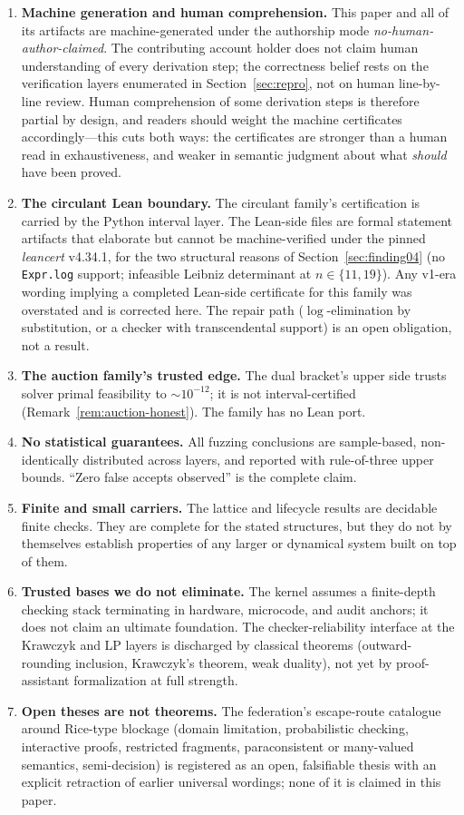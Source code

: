 \documentclass[11pt]{article}
\theoremstyle{definition}
\theoremstyle{remark}
\newcommand{\lean}[1]{\texttt{#1}}
\begin{document}
\begin{enumerate}
\item \textbf{Machine generation and human comprehension.}
This paper and all of its artifacts are machine-generated under the
authorship mode \emph{no-human-author-claimed}. The contributing account
holder does not claim human understanding of every derivation step; the
correctness belief rests on the verification layers enumerated in
Section~\ref{sec:repro}, not on human line-by-line review. Human
comprehension of some derivation steps is therefore partial by design, and
readers should weight the machine certificates accordingly---this cuts both
ways: the certificates are stronger than a human read in exhaustiveness, and
weaker in semantic judgment about what \emph{should} have been proved.
\item \textbf{The circulant Lean boundary.} The circulant family's
certification is carried by the Python interval layer. The Lean-side files
are formal statement artifacts that elaborate but cannot be machine-verified
under the pinned \emph{leancert} v4.34.1, for the two structural reasons of
Section~\ref{sec:finding04} (no \lean{Expr.log} support; infeasible Leibniz
determinant at $n\in\{11,19\}$). Any v1-era wording implying a completed
Lean-side certificate for this family was overstated and is corrected here.
The repair path ($\log$-elimination by substitution, or a checker with
transcendental support) is an open obligation, not a result.
\item \textbf{The auction family's trusted edge.} The dual bracket's upper
side trusts solver primal feasibility to $\sim 10^{-12}$; it is not
interval-certified (Remark~\ref{rem:auction-honest}). The family has no Lean
port.
\item \textbf{No statistical guarantees.} All fuzzing conclusions are
sample-based, non-identically distributed across layers, and reported with
rule-of-three upper bounds. ``Zero false accepts observed'' is the complete
claim.
\item \textbf{Finite and small carriers.} The lattice and lifecycle results
are decidable finite checks. They are complete for the stated structures, but
they do not by themselves establish properties of any larger or dynamical
system built on top of them.
\item \textbf{Trusted bases we do not eliminate.} The kernel assumes a
finite-depth checking stack terminating in hardware, microcode, and audit
anchors; it does not claim an ultimate foundation. The checker-reliability
interface at the Krawczyk and LP layers is discharged by classical theorems
(outward-rounding inclusion, Krawczyk's theorem, weak duality), not yet by
proof-assistant formalization at full strength.
\item \textbf{Open theses are not theorems.} The federation's escape-route
catalogue around Rice-type blockage (domain limitation, probabilistic
checking, interactive proofs, restricted fragments, paraconsistent or
many-valued semantics, semi-decision) is registered as an open, falsifiable
thesis with an explicit retraction of earlier universal wordings; none of it
is claimed in this paper.
\end{enumerate}
\end{document}

